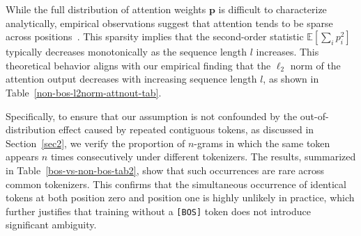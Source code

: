 \documentclass[]{template}
\theoremstyle{plain}
\theoremstyle{definition}
\theoremstyle{remark}
\begin{document}
While the full distribution of attention weights $\mathbf{p}$ is difficult to characterize analytically, empirical observations suggest that attention tends to be sparse across positions~\citep{zucchet2025the}. This sparsity implies that the second-order statistic $\mathbb{E}\left[\sum_i p_i^2\right]$ typically decreases monotonically as the sequence length $l$ increases. This theoretical behavior aligns with our empirical finding that the $\ell_2$ norm of the attention output decreases with increasing sequence length $l$, as shown in Table~\ref{non-bos-l2norm-attnout-tab}.

Specifically, to ensure that our assumption is not confounded by the out-of-distribution effect caused by repeated contiguous tokens, as discussed in Section~\ref{sec2}, we verify the proportion of $n$-grams in which the same token appears $n$ times consecutively under different tokenizers. The results, summarized in Table~\ref{bos-vs-non-bos-tab2}, show that such occurrences are rare across common tokenizers. This confirms that the simultaneous occurrence of identical tokens at both position zero and position one is highly unlikely in practice, which further justifies that training without a \texttt{[BOS]} token does not introduce significant ambiguity.

\begin{table}[t]
\caption{$\ell_2$ Norm of Layer 0 Attention Output, w/o \texttt{[BOS]}}
\label{non-bos-l2norm-attnout-tab}
\end{table}
\end{document}
